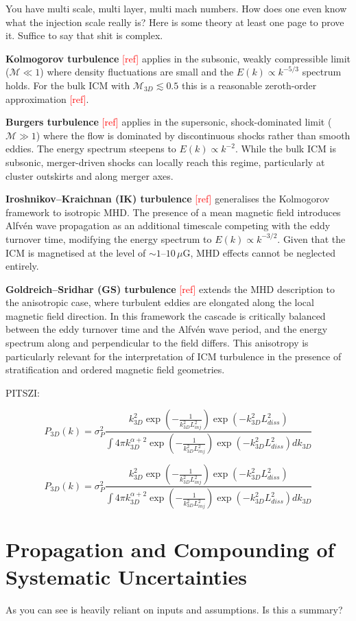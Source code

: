 You have multi scale, multi layer, multi mach numbers. How does one even know what the injection scale really is? Here is some theory at least one page to prove it. Suffice to say that shit is complex. 

\textbf{Kolmogorov turbulence} \textcolor{red}{[ref]} applies in the subsonic, weakly compressible limit ($\mathcal{M} \ll 1$) where density fluctuations are small and the $E(k) \propto k^{-5/3}$ spectrum holds. For the bulk ICM with $\mathcal{M}_{3D} \lesssim 0.5$ this is a reasonable zeroth-order approximation \textcolor{red}{[ref]}.

\textbf{Burgers turbulence} \textcolor{red}{[ref]} applies in the supersonic, shock-dominated limit ($\mathcal{M} \gg 1$) where the flow is dominated by discontinuous shocks rather than smooth eddies. The energy spectrum steepens to $E(k) \propto k^{-2}$. While the bulk ICM is subsonic, merger-driven shocks can locally reach this regime, particularly at cluster outskirts and along merger axes.

\textbf{Iroshnikov--Kraichnan (IK) turbulence} \textcolor{red}{[ref]} generalises the Kolmogorov framework to isotropic MHD. The presence of a mean magnetic field introduces Alfvén wave propagation as an additional timescale competing with the eddy turnover time, modifying the energy spectrum to $E(k) \propto k^{-3/2}$. Given that the ICM is magnetised at the level of $\sim 1$--$10\,\mu$G, MHD effects cannot be neglected entirely.

\textbf{Goldreich--Sridhar (GS) turbulence} \textcolor{red}{[ref]} extends the MHD description to the anisotropic case, where turbulent eddies are elongated along the local magnetic field direction. In this framework the cascade is critically balanced between the eddy turnover time and the Alfvén wave period, and the energy spectrum along and perpendicular to the field differs. This anisotropy is particularly relevant for the interpretation of ICM turbulence in the presence of stratification and ordered magnetic field geometries.

PITSZI:

\begin{equation}
	P_{3D}(k) = \sigma_{P}^2 \frac{ {k_{3D}^2} \exp{(-\frac{1}{k_{3D}^2 L_{inj}^2})}  \exp{( -k_{3D}^2 L_{diss}^2 )}  }{\int 4\pi k_{3D}^{\alpha + 2} \exp{(-\frac{1}{k_{3D}^2 L_{inj}^2})} \exp{( -k_{3D}^2 L_{diss}^2 )} dk_{3D}     }
	\label{eq:P3DkPitszi}
\end{equation}

\begin{equation}
	P_{3D}(k) = \sigma_{P}^2 \frac{ {k_{3D}^2} \exp{(-\frac{1}{k_{3D}^2 L_{inj}^2})}  \exp{( -k_{3D}^2 L_{diss}^2 )}  }{\int 4\pi k_{3D}^{\alpha + 2} \exp{(-\frac{1}{k_{3D}^2 L_{inj}^2})} \exp{( -k_{3D}^2 L_{diss}^2 )} dk_{3D}     }
	\label{eq:P3DkPitszi}
\end{equation}

\section{Propagation and Compounding of Systematic Uncertainties}\label{Chap:assumptionsPropagationandCompoundingof SystematicUncertainties}

As you can see is heavily reliant on inputs and assumptions. Is this a summary?